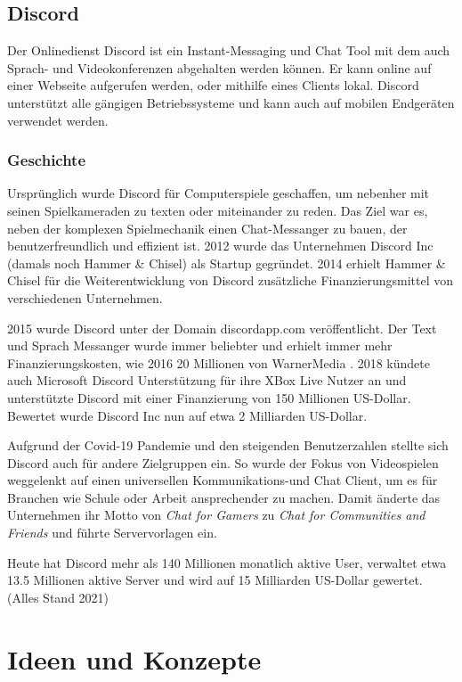\documentclass[a4paper]{article}
\begin{document}
\subsection{Discord}
Der Onlinedienst Discord ist ein Instant-Messaging und Chat Tool mit dem auch Sprach- und Videokonferenzen 
abgehalten werden können. Er kann online auf einer Webseite aufgerufen werden, oder mithilfe eines Clients lokal. 
Discord unterstützt alle gängigen Betriebssysteme und kann auch auf mobilen Endgeräten verwendet werden.

\subsubsection{Geschichte}
Ursprünglich wurde Discord für Computerspiele geschaffen, um nebenher mit seinen Spielkameraden zu texten oder
miteinander zu reden. Das Ziel war es, neben der komplexen Spielmechanik einen Chat-Messanger zu bauen, der 
benutzerfreundlich und effizient ist. 2012 wurde das Unternehmen Discord Inc (damals noch Hammer \& Chisel)
als Startup gegründet.\autocite{} 2014 erhielt Hammer \& Chisel für die Weiterentwicklung von Discord zusätzliche
Finanzierungsmittel von verschiedenen Unternehmen.

2015 wurde Discord unter der Domain discordapp.com veröffentlicht. Der Text und Sprach Messanger wurde immer beliebter
und erhielt immer mehr Finanzierungskosten, wie 2016 20 Millionen von WarnerMedia \autocite{} .
2018 kündete auch Microsoft Discord Unterstützung für ihre XBox Live Nutzer an und unterstützte Discord mit einer Finanzierung
von 150 Millionen US-Dollar. Bewertet wurde Discord Inc nun auf etwa 2 Milliarden US-Dollar.

Aufgrund der Covid-19 Pandemie und den steigenden Benutzerzahlen stellte sich Discord auch für andere Zielgruppen ein. 
So wurde der Fokus von Videospielen weggelenkt auf einen universellen Kommunikations-und Chat Client, um es für Branchen 
wie Schule oder Arbeit ansprechender zu machen. Damit änderte das Unternehmen ihr Motto von \textit{Chat for Gamers} zu 
\textit{Chat for Communities and Friends} und führte Servervorlagen ein.

Heute hat Discord mehr als 140 Millionen monatlich aktive User, verwaltet etwa 13.5 Millionen aktive Server und
wird auf 15 Milliarden US-Dollar gewertet. (Alles Stand 2021) \autocite{}

\autocite{discord_wiki}


\section{Ideen und Konzepte}
\end{document}
